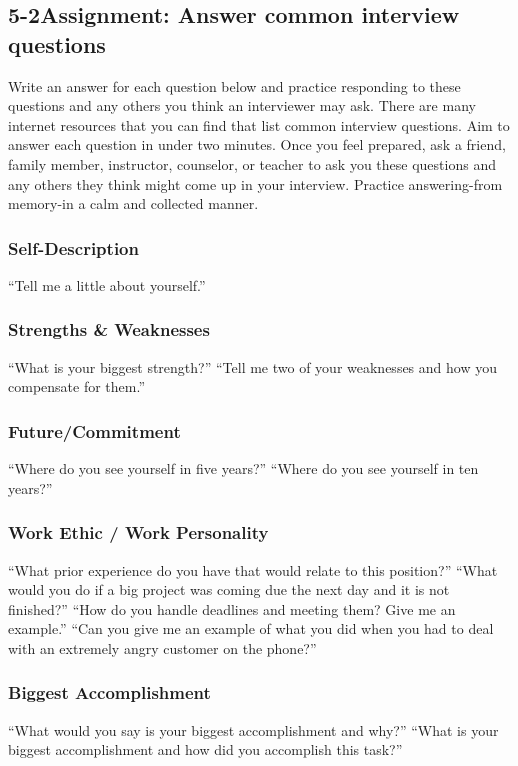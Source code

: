 \pagebreak \subsection*{5-2\quad Assignment: Answer common interview questions}
Write an answer for each question below and practice responding to these questions and any others you think an interviewer may ask. There are many internet resources that you can find that list common interview questions. Aim to answer each question in under two minutes. Once you feel prepared, ask a friend, family member, instructor, counselor, or teacher to ask you these questions and any others they think might come up in your interview. Practice answering-from memory-in a calm and collected manner.

\subsubsection*{Self-Description}
\break ``Tell me a little about yourself.''

\subsubsection*{Strengths \& Weaknesses}
\break ``What is your biggest strength?''
\break ``Tell me two of your weaknesses and how you compensate for them.''

\subsubsection*{Future/Commitment}
\break ``Where do you see yourself in five years?''
\break ``Where do you see yourself in ten years?''

\subsubsection*{Work Ethic / Work Personality}
\break ``What prior experience do you have that would relate to this position?''
\break ``What would you do if a big project was coming due the next day and it is not finished?''
\break ``How do you handle deadlines and meeting them? Give me an example.''
\break ``Can you give me an example of what you did when you had to deal with an extremely angry customer on the phone?''

\subsubsection*{Biggest Accomplishment}
\break ``What would you say is your biggest accomplishment and why?''
\break ``What is your biggest accomplishment and how did you accomplish this task?''

